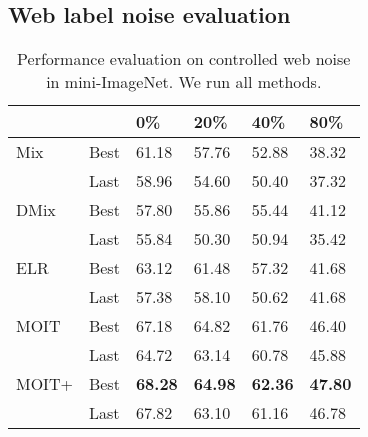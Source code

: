 \documentclass[final]{cvpr}
\begin{document}
\subsection{Web label noise evaluation}

\begin{table}[t]
\begin{centering}
\caption{\label{tab:miniImageNetEval}Performance evaluation on controlled
web noise in mini-ImageNet. We run all methods.}
\medskip{}
{\small{}}{\small\par}
\par\end{centering}
\centering{}{\small{}}\begin{tabularx}{\columnwidth}{Xlllll}
\toprule 
 & & {\small{}0\%} & {\small{}20\%} & {\small{}40\%} & {\small{}80\%}\tabularnewline
\midrule 
{\small{}Mix \cite{2018_ICLR_mixup}} & {\small{}Best} & {\small{}61.18} & {\small{}57.76} & {\small{}52.88} & {\small{}38.32}\tabularnewline
 & {\small{}Last} & {\small{}58.96} & {\small{}54.60} & {\small{}50.40} & {\small{}37.32} \tabularnewline

{\small{}DMix \cite{2020_ICLR_DivideMix}} & {\small{}Best} & {\small{}57.80} & {\small{}55.86} & {\small{}55.44} & {\small{}41.12}\tabularnewline
 & {\small{}Last} & {\small{}55.84} & {\small{}50.30} & {\small{}50.94} & {\small{}35.42} \tabularnewline

{\small{}ELR \cite{2020_NeurIPS_EarlyReg}} & {\small{}Best} & {\small{}63.12} & {\small{}61.48} & {\small{}57.32} & {\small{}41.68}\tabularnewline
 & {\small{}Last} & {\small{}57.38} & {\small{}58.10} & {\small{}50.62} & {\small{}41.68} \tabularnewline

\midrule
{\small{}MOIT} & {\small{}Best} & {\small{}67.18} & {\small{}64.82} & {\small{}61.76} & {\small{}46.40}\tabularnewline
 & {\small{}Last} & {\small{}64.72} & {\small{}63.14} & {\small{}60.78} & {\small{}45.88} \tabularnewline

{\small{}MOIT+} & {\small{}Best} & \textbf{\small{}68.28} & \textbf{\small{}64.98} & \textbf{\small{}62.36} & \textbf{\small{}47.80}\tabularnewline
 & {\small{}Last} & {\small{}67.82} & {\small{}63.10} & {\small{}61.16} & {\small{}46.78} \tabularnewline

\bottomrule
\end{tabularx}{\small\par}
\end{table}
\end{document}
